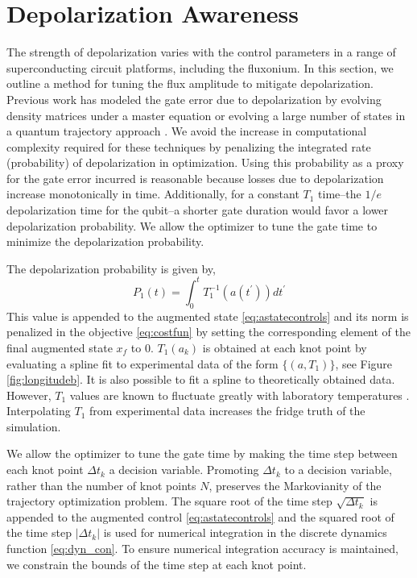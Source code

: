 \section{Depolarization Awareness \label{sec:longitude}}
The strength of depolarization varies
with the control parameters in a range of superconducting circuit platforms,
including the fluxonium. In this section, we outline a method
for tuning the flux amplitude to mitigate depolarization.
Previous work has modeled the gate error due to depolarization
by evolving density matrices under a master
equation \cite{rembold2020introduction, schulteherbruggen2011optimal}
or evolving a large number of states in a quantum trajectory approach
\cite{abdelhafez2019gradient}.
We avoid the increase in computational complexity required for these
techniques by
penalizing the integrated rate (probability) of depolarization in optimization.
Using this probability as a proxy for the gate error incurred
is reasonable because losses due to depolarization increase monotonically
in time. Additionally, for a constant $T_{1}$ time--the $1/e$ depolarization
time for the qubit--a shorter gate duration
would favor a lower depolarization probability. We allow
the optimizer to tune the gate time to minimize the
depolarization probability.

The depolarization probability is given by,
\begin{equation}
  P_{1}(t) = \int_{0}^{t} T_{1}^{-1}(a(t^{\prime})) dt^{\prime}
\end{equation}
This value is appended to the augmented state \eqref{eq:astatecontrols}
and its norm is penalized in the objective \eqref{eq:costfun} by setting
the corresponding element of the final augmented state $x_{f}$ to $0$.
$T_{1}(a_{k})$ is obtained at each knot point by evaluating
a spline fit to experimental data of the form $\{(a, T_{1})\}$,
see Figure \ref{fig:longitudeb}.
It is also possible to fit a spline to theoretically obtained data.
However, $T_{1}$ values are known to fluctuate greatly
with laboratory temperatures \cite{klimov2018fluctuations}.
Interpolating $T_{1}$ from experimental data
increases the fridge truth of the simulation.

We allow the optimizer to tune the gate time by
making the time step between each knot point $\Delta t_{k}$
a decision variable. Promoting $\Delta t_{k}$ to a decision variable, rather
than the number of knot points $N$, preserves the
Markovianity of the trajectory
optimization problem. The square root of the time step $\sqrt{\Delta t_{k}}$
is appended to the augmented control \eqref{eq:astatecontrols}
and the squared root
of the time step $\lvert \Delta t_{k} \rvert$ is used
for numerical integration in the discrete dynamics function \eqref{eq:dyn_con}.
To ensure numerical
integration accuracy is maintained, we constrain
the bounds of the time step at each knot point.

